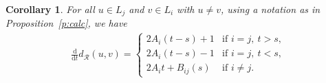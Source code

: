 \documentclass[alpha-refs]{wiley-article}
\newtheorem{cor}{Corollary}
\begin{document}
\begin{cor}\label{c:weight}
For all $u\in L_j$ and $v\in L_i$ with $u\not=v$, %
using a notation as in Proposition~\ref{p:calc}, we have
 \begin{align}
\frac{\mathrm d}{\mathrm d t}d_{\mathcal{R}}(u,v) =
\begin{cases}
2A_i(t-s)+1 & \text{if }i=j,\ t> s,\\
2A_i(t-s)-1 & \text{if }i=j,\ t< s,\\
2A_it+B_{ij}(s) & \text{if }i\not=j.
\end{cases}
\label{e:der-d-R} %
\end{align}
\end{cor}
\end{document}
